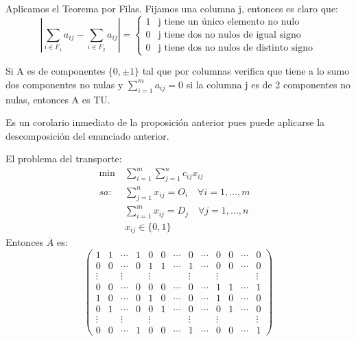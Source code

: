\documentclass[PM.tex]{subfiles}
\begin{document}
\begin{dem}
Aplicamos el Teorema por Filas. Fijamos una columna j, entonces es claro que:
\[
\left| \sum_{i\in F_1}a_{ij}-\sum_{i\in F_2}a_{ij} \right| =
\begin{cases}
1 & \text{j tiene un único elemento no nulo}\\
0 & \text{j tiene dos no nulos de igual signo}\\
0 & \text{j tiene dos no nulos de distinto signo}
\end{cases}
\]
\end{dem}
\begin{prop}
Si A es de componentes $\{0,\pm1\}$ tal que por columnas verifica que tiene a lo sumo dos componentes no nulas y $\sum_{i=1}^m a_{ij}=0$ si la columna j es de 2 componentes no nulas, entonces A es TU.
\end{prop}
\begin{dem}
Es un corolario inmediato de la proposición anterior pues puede aplicarse la descomposición del enunciado anterior.
\end{dem}
\begin{example}
El problema del transporte:
\begin{align*}
 \min\ & \sum_{i=1}^m\sum_{j=1}^n c_{ij}x_{ij} &\\
sa:& \sum_{j=1}^n x_{ij}= O_i \quad\forall i =1,\dots, m & \\
& \sum_{i=1}^m x_{ij}= D_j \quad \forall j =1,\dots,n &   \\
& x_{ij}\in\{0,1\} &
\end{align*}
Entonces $\overline{A}$ es:
\[\left(
\begin{array}{ccccccccccccc}
1 & 1 & \cdots & 1 & 0 & 0 &\cdots  & 0 & \cdots & 0 & 0 &  \cdots & 0\\
0 &	0 & \cdots & 0 & 1 & 1 & \cdots & 1 & \cdots & 0 & 0 & \cdots & 0\\
\vdots & &\vdots & &\vdots & & &\vdots & &\vdots & & \ & \vdots\\
0 & 0 & \cdots & 0 & 0 & 0 & \cdots & 0 & \cdots & 1 & 1 & \cdots & 1\\
1 & 0 & \cdots & 0 & 1 & 0& \cdots & 0 & \cdots  & 1 & 0 & \cdots & 0 \\
0 & 1 & \cdots & 0 & 0 & 1& \cdots & 0 & \cdots  & 0 & 1 & \cdots & 0 \\
\vdots & &\vdots & &\vdots & & &\vdots & &\vdots &   &   & \vdots\\
0 & 0 & \cdots & 1 & 0 & 0& \cdots & 1 & \cdots  & 0 & 0 & \cdots & 1
\end{array}\right)
\]
\end{example}
\end{document}
